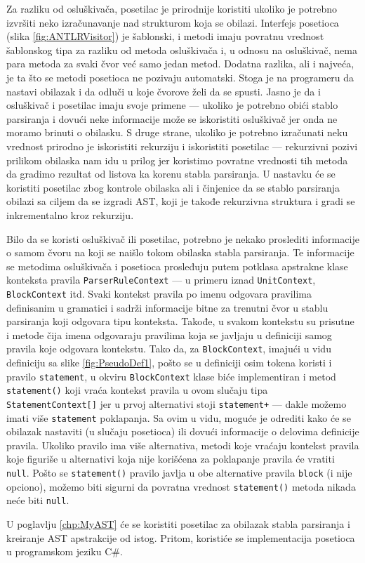 Za razliku od osluškivača, posetilac je prirodnije koristiti ukoliko je potrebno izvršiti neko izračunavanje nad strukturom koja se obilazi. Interfejs posetioca (slika \ref{fig:ANTLRVisitor}) je šablonski, i metodi imaju povratnu vrednost šablonskog tipa za razliku od metoda osluškivača i, u odnosu na osluškivač, nema para metoda za svaki čvor već samo jedan metod. Dodatna razlika, ali i najveća, je ta što se metodi posetioca ne pozivaju automatski. Stoga je na programeru da nastavi obilazak i da odluči u koje čvorove želi da se spusti. Jasno je da i osluškivač i posetilac imaju svoje primene --- ukoliko je potrebno obići stablo parsiranja i dovući neke informacije može se iskoristiti osluškivač jer onda ne moramo brinuti o obilasku. S druge strane, ukoliko je potrebno izračunati neku vrednost prirodno je iskoristiti rekurziju i iskoristiti posetilac --- rekurzivni pozivi prilikom obilaska nam idu u prilog jer koristimo povratne vrednosti tih metoda da gradimo rezultat od listova ka korenu stabla parsiranja. U nastavku će se koristiti posetilac zbog kontrole obilaska ali i činjenice da se stablo parsiranja obilazi sa ciljem da se izgradi AST, koji je takođe rekurzivna struktura i gradi se inkrementalno kroz rekurziju.

Bilo da se koristi osluškivač ili posetilac, potrebno je nekako proslediti informacije o samom čvoru na koji se naišlo tokom obilaska stabla parsiranja. Te informacije se metodima osluškivača i posetioca prosleđuju putem potklasa apstrakne klase konteksta pravila \texttt{ParserRuleContext} --- u primeru iznad \texttt{UnitContext}, \texttt{BlockContext} itd. Svaki kontekst pravila po imenu odgovara pravilima definisanim u gramatici i sadrži informacije bitne za trenutni čvor u stablu parsiranja koji odgovara tipu konteksta. Takođe, u svakom kontekstu su prisutne i metode čija imena odgovaraju pravilima koja se javljaju u definiciji samog pravila koje odgovara kontekstu. Tako da, za \texttt{BlockContext}, imajući u vidu definiciju sa slike \ref{fig:PseudoDef1}, pošto se u definiciji osim tokena koristi i pravilo \texttt{statement}, u okviru \texttt{BlockContext} klase biće implementiran i metod \texttt{statement()} koji vraća kontekst pravila u ovom slučaju tipa \texttt{StatementContext[]} jer u prvoj alternativi stoji \texttt{statement+} --- dakle možemo imati više \texttt{statement} poklapanja. Sa ovim u vidu, moguće je odrediti kako će se obilazak nastaviti (u slučaju posetioca) ili dovući informacije o delovima definicije pravila. Ukoliko pravilo ima više alternativa, metodi koje vraćaju kontekst pravila koje figuriše u alternativi koja nije korišćena za poklapanje pravila će vratiti \texttt{null}. Pošto se \texttt{statement()} pravilo javlja u obe alternative pravila \texttt{block} (i nije opciono), možemo biti sigurni da povratna vrednost \texttt{statement()} metoda nikada neće biti \texttt{null}.

U poglavlju \ref{chp:MyAST} će se koristiti posetilac za obilazak stabla parsiranja i kreiranje AST apstrakcije od istog. Pritom, koristiće se implementacija posetioca u programskom jeziku C\#. 
